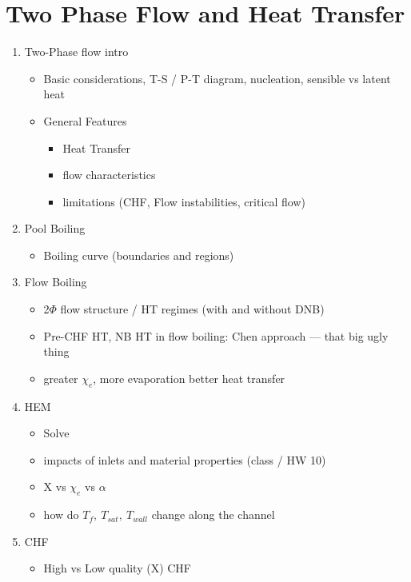 \documentclass{article}
\begin{document}
\section{Two Phase Flow and Heat Transfer}
\begin{enumerate}
    \item Two-Phase flow intro
    \begin{itemize}
        \item Basic considerations, T-S / P-T diagram, nucleation, sensible vs latent heat
        \item General Features
        \begin{itemize}
            \item Heat Transfer
            \item flow characteristics
            \item limitations (CHF, Flow instabilities, critical flow)
        \end{itemize}
    \end{itemize}
    \item Pool Boiling
    \begin{itemize}
        \item Boiling curve (boundaries and regions)    
    \end{itemize}
    \item Flow Boiling
    \begin{itemize}
        \item 2$\Phi$ flow structure / HT regimes (with and without DNB)
        \item Pre-CHF HT, NB HT in flow boiling: Chen approach --- that big ugly thing
        \item greater $\chi_e$, more evaporation better heat transfer
    \end{itemize}
    \item HEM
    \begin{itemize}
        \item Solve
        \item impacts of inlets and material properties (class / HW 10)
        \item X vs $\chi_e$ vs $\alpha$
        \item how do $T_f,\ T_{sat},\ T_{wall}$ change along the channel
    \end{itemize}
    \item CHF
    \begin{itemize}
        \item High vs Low quality (X) CHF
        \begin{itemize}

\end{itemize}
\end{itemize}
\end{enumerate}
\end{document}
